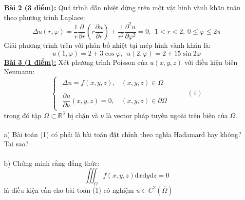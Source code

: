 \documentclass[10.5pt, a4paper]{article}
\begin{document}
\color{red}\underline{\textbf{Bài 2 (3 điểm):}} \color{black}Quá trình dẫn nhiệt dừng trên một vật hình vành khăn tuân theo phương trình Laplace: $$\Delta u(r,\varphi)=\dfrac1r\dfrac{\partial}{\partial r}\left(r\dfrac{\partial u}{\partial r}\right)+\dfrac{1}{r^2}\dfrac{\partial^2u}{\partial\varphi^2}=0,~~1<r<2,~0\le\varphi\le2\pi$$
Giải phương trình trên với phân bố nhiệt tại mép hình vành khăn là: $$u(1,\varphi)=2+3\cos\varphi,~~u(2,\varphi)=2+15\sin2\varphi$$
\color{red}\underline{\textbf{Bài 3 (1 điểm):}} \color{black}Xét phương trình Poisson của $u(x,y,z)$ với điều kiện biên Neumann: $$\begin{cases}
\begin{array}{ll}
\Delta u=f(x,y,z), & (x,y,z)\in\Omega\\\\
\dfrac{\partial u}{\partial\nu}(x,y,z)=0, & (x,y,z)\in\partial\Omega
\end{array}
\end{cases}~~~~~~~~~~(1)$$
trong đó tập $\Omega\subset\mathbb R^3$ bị chặn và $\nu$ là vector pháp tuyến ngoài trên biên của $\Omega$.\\\\
\color{red}a) \color{black}Bài toán (1) có phải là bài toán đặt chỉnh theo nghĩa Hadamard hay không? Tại sao?\\\\
\color{red}b) \color{black}Chứng minh rằng đẳng thức: $$\displaystyle\iiint_\Omega f(x,y,z)\text{d}x\text{d}y\text{d}z=0$$ là điều kiện cần cho bài toán (1) có nghiệm $u\in C^2(\overline\Omega)$

\newpage
\end{document}
